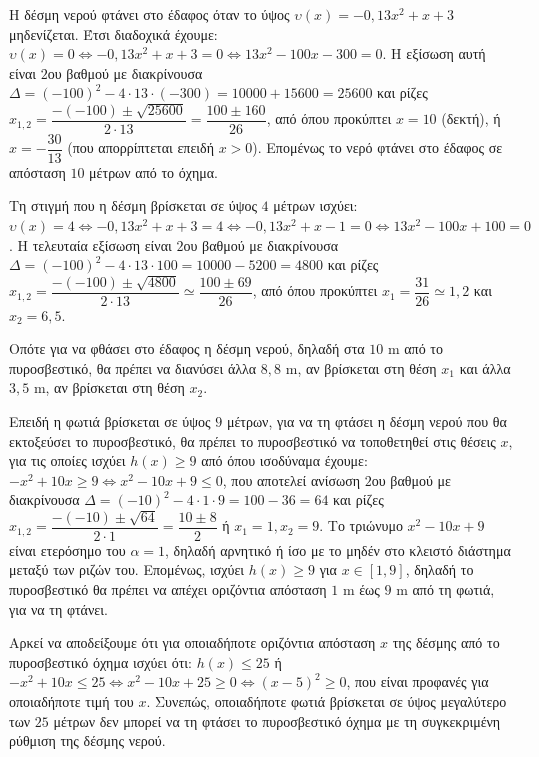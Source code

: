 
\begin{alist}
\item
\begin{rlist}
\item Η δέσμη νερού φτάνει στο έδαφος όταν το ύψος $\upsilon(x) = -0,13x^2 + x + 3$ μηδενίζεται. Έτσι διαδοχικά έχουμε:
$\upsilon(x) = 0 \Leftrightarrow -0,13x^2 + x + 3 = 0 \Leftrightarrow 13x^2 - 100x - 300 = 0$. Η εξίσωση αυτή είναι $2$ου βαθμού με διακρίνουσα $\Delta = (-100)^2 - 4 \cdot 13 \cdot (-300) = 10000 + 15600 = 25600$ και ρίζες
$x_{1,2} = \dfrac{-(-100) \pm \sqrt{25600}}{2 \cdot 13} = \dfrac{100 \pm 160}{26}$, από όπου προκύπτει $x = 10$ (δεκτή), ή $x = -\dfrac{30}{13}$ (που απορρίπτεται επειδή $x > 0$).
Επομένως το νερό φτάνει στο έδαφος σε απόσταση $10$ μέτρων από το όχημα.

\item Τη στιγμή που η δέσμη βρίσκεται σε ύψος $4$ μέτρων ισχύει:
$\upsilon(x) = 4 \Leftrightarrow -0,13x^2 + x + 3 = 4 \Leftrightarrow -0,13x^2 + x - 1 = 0 \Leftrightarrow 13x^2 - 100x + 100 = 0$. Η τελευταία εξίσωση είναι $2$ου βαθμού με διακρίνουσα $\Delta = (-100)^2 - 4 \cdot 13 \cdot 100 = 10000 - 5200 = 4800$ και ρίζες
$x_{1,2} = \dfrac{-(-100) \pm \sqrt{4800}}{2 \cdot 13} \simeq \dfrac{100 \pm 69}{26}$, από όπου προκύπτει $x_1 = \dfrac{31}{26} \simeq 1,2$ και $x_2 = 6,5$.

Οπότε για να φθάσει στο έδαφος η δέσμη νερού, δηλαδή στα $10\text{ m}$ από το πυροσβεστικό, θα πρέπει να διανύσει άλλα $8,8\text{ m}$, αν βρίσκεται στη θέση $x_1$ και άλλα $3,5\text{ m}$, αν βρίσκεται στη θέση $x_2$.
\end{rlist}

\item
\begin{rlist}
\item Επειδή η φωτιά βρίσκεται σε ύψος $9$ μέτρων, για να τη φτάσει η δέσμη νερού που θα εκτοξεύσει το πυροσβεστικό, θα πρέπει το πυροσβεστικό να τοποθετηθεί στις θέσεις $x$, για τις οποίες ισχύει $h(x) \ge 9$ από όπου ισοδύναμα έχουμε:
$-x^2 + 10x \ge 9 \Leftrightarrow x^2 - 10x + 9 \le 0$, που αποτελεί ανίσωση $2$ου βαθμού με διακρίνουσα $ \Delta = (-10)^2 - 4 \cdot 1 \cdot 9 = 100 - 36 = 64$ και ρίζες
$x_{1,2} = \dfrac{-(-10) \pm \sqrt{64}}{2 \cdot 1} = \dfrac{10 \pm 8}{2}$ ή $x_1 = 1, x_2 = 9$. Το τριώνυμο $x^2 - 10x + 9$ είναι ετερόσημο του $\alpha = 1$, δηλαδή αρνητικό ή ίσο με το μηδέν στο κλειστό διάστημα μεταξύ των ριζών του. Επομένως, ισχύει $h(x) \ge 9$ για $x \in [1, 9]$, δηλαδή το πυροσβεστικό θα πρέπει να απέχει οριζόντια απόσταση $1\text{ m}$ έως $9\text{ m}$ από τη φωτιά, για να τη φτάνει.

\item Αρκεί να αποδείξουμε ότι για οποιαδήποτε οριζόντια απόσταση $x$ της δέσμης από το πυροσβεστικό όχημα ισχύει ότι:
$h(x) \le 25$ ή $-x^2 + 10x \le 25 \Leftrightarrow x^2 - 10x + 25 \ge 0 \Leftrightarrow (x - 5)^2 \ge 0$, που είναι προφανές για οποιαδήποτε τιμή του $x$. Συνεπώς, οποιαδήποτε φωτιά βρίσκεται σε ύψος μεγαλύτερο των $25$ μέτρων δεν μπορεί να τη φτάσει το πυροσβεστικό όχημα με τη συγκεκριμένη ρύθμιση της δέσμης νερού.
\end{rlist}
\end{alist}

